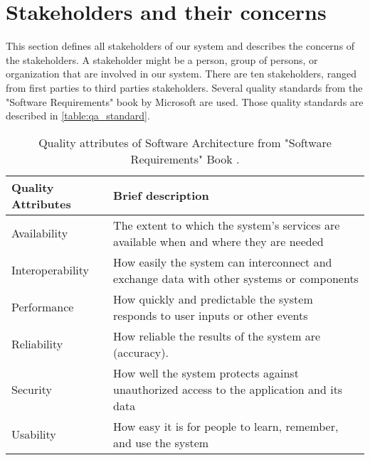 \section{Stakeholders and their concerns}



This section defines all stakeholders of our system and describes the concerns of the stakeholders. A stakeholder might be a person, group of persons, or organization that are involved in our system. There are ten stakeholders, ranged from first parties to third parties stakeholders. Several quality standards from the "Software Requirements" book by Microsoft \cite{wiegers2013software} are used. Those quality standards are described in \autoref{table:qa_standard}.

\begin{table}[!htbp] \centering
	\caption{Quality attributes of Software Architecture from "Software Requirements" Book \cite{wiegers2013software}.}
	\label{table:qa_standard}
	\begin{tabular}{L{} L{}}
		\toprule
		\textbf{Quality Attributes} & \textbf{Brief description}                                                                                        \\ \midrule
		Availability                & The extent to which the system's services are available when and where they are needed                            \\
		Interoperability            & How easily the system can interconnect and exchange data with other systems or components                         \\
		Performance                 & How quickly and predictable the system responds to user inputs or other events                                    \\
		Reliability                 & How reliable the results of the system are (accuracy). \\
		Security                    & How well the system protects against unauthorized access to the application and its data                          \\
		Usability                   & How easy it is for people to learn, remember, and use the system                                                  \\
		\bottomrule
	\end{tabular}
\end{table}

